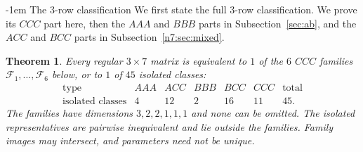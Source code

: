 \documentclass[11pt,a4paper]{article}
\makeatletter
\newtheorem{theorem}{Theorem}[section]
\theoremstyle{plain}
\theoremstyle{definition}
\numberwithin{equation}{section}
\renewcommand\subsection{\@startsection{subsection}{2}{\z@}  {\medskipamount}  {-1em}  {\normalfont\normalsize\bfseries}}
\makeatother
\begin{document}
\subsection{The 3-row classification}\label{n7:sec:ccc}
We first state the full $3$-row classification. We prove its $CCC$ part here, then the $AAA$ and $BBB$ parts in Subsection~\ref{sec:ab}, and the $ACC$ and $BCC$ parts in Subsection~\ref{n7:sec:mixed}.
\begin{theorem}\label{global}\label{ccc:classification}
Every regular $3\times7$ matrix is equivalent to $1$ of the $6$ $CCC$ families $\mathcal F_1,\ldots,\mathcal F_6$ below, or to $1$ of $45$ isolated classes:
$$
\begin{array}{c|rrrrr|r}
\text{type}&AAA&ACC&BBB&BCC&CCC&\text{total}\\\hline
\text{isolated classes}&4&12&2&16&11&45.
\end{array}
$$
The families have dimensions $3,2,2,1,1,1$ and none can be omitted. The isolated representatives are pairwise inequivalent and lie outside the families. Family images may intersect, and parameters need not be unique.
\end{theorem}
\end{document}
